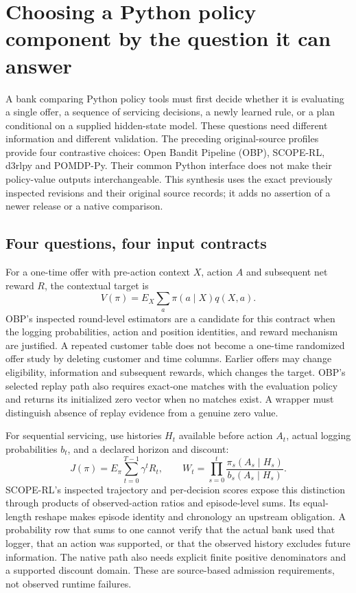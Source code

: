 \section{Choosing a Python policy component by the question it can answer}
\label{sec:exec24-policies-python}

A bank comparing Python policy tools must first decide whether it is evaluating
a single offer, a sequence of servicing decisions, a newly learned rule, or a
plan conditional on a supplied hidden-state model. These questions need different
information and different validation. The preceding original-source profiles
provide four contrastive choices: Open Bandit Pipeline (OBP), SCOPE-RL, d3rlpy
and POMDP-Py. Their common Python interface does not make their policy-value
outputs interchangeable. This synthesis uses the exact previously inspected
revisions and their original source records; it adds no assertion of a newer
release or a native comparison.~\citep{exec23_obp_sources,exec23_scope_rl_sources,
exec15_d3rlpy_package,exec23_pomdppy_sources}

\subsection{Four questions, four input contracts}

For a one-time offer with pre-action context $X$, action $A$ and subsequent net
reward $R$, the contextual target is
\[
 V(\pi)=E_X\sum_a\pi(a\mid X)q(X,a).
\]
OBP's inspected round-level estimators are a candidate for this contract when
the logging probabilities, action and position identities, and reward mechanism
are justified. A repeated customer table does not become a one-time randomized
offer study by deleting customer and time columns. Earlier offers may change
eligibility, information and subsequent rewards, which changes the target.
OBP's selected replay path also requires exact-one matches with the evaluation
policy and returns its initialized zero vector when no matches exist. A wrapper
must distinguish absence of replay evidence from a genuine zero value.
\citep{exec23_obp_sources}

For sequential servicing, use histories $H_t$ available before action $A_t$,
actual logging probabilities $b_t$, and a declared horizon and discount:
\[
 J(\pi)=E_\pi\sum_{t=0}^{T-1}\gamma^tR_t,
 \qquad W_t=\prod_{s=0}^{t}\frac{\pi_s(A_s\mid H_s)}{b_s(A_s\mid H_s)}.
\]
SCOPE-RL's inspected trajectory and per-decision scores expose this distinction
through products of observed-action ratios and episode-level sums. Its equal-length
reshape makes episode identity and chronology an upstream obligation. A probability
row that sums to one cannot verify that the actual bank used that logger, that
an action was supported, or that the observed history excludes future information.
The native path also needs explicit finite positive denominators and a supported
discount domain. These are source-based admission requirements, not observed
runtime failures.~\citep{exec23_scope_rl_sources}

